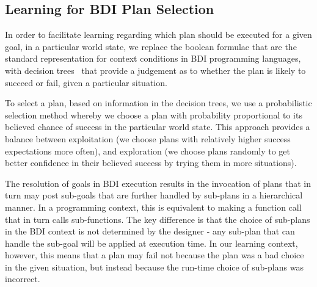 \subsection{Learning for BDI Plan Selection}
In order to facilitate learning regarding which plan should be
executed for a given goal, in a particular world state, we replace the
boolean formulae that are the standard representation for context
conditions in BDI programming languages, with decision
trees~\cite{Mitchell97:ML} that provide a judgement as to whether the
plan is likely to succeed or fail, given a particular situation. 

To select a plan, based on information in the decision trees, we use a
probabilistic selection method whereby we choose a plan with
probability proportional to its believed chance of success in the
particular world state. This approach provides a balance between
exploitation (we choose plans with relatively higher success expectations
more often), and exploration (we choose plans randomly to get better
confidence in their believed success by trying them in more 
situations).

The resolution of goals in BDI execution results in 
the invocation of plans that in turn may post sub-goals that are further
handled by sub-plans in a hierarchical manner. In a programming context,
this is equivalent to making a function call that in turn calls sub-functions.
The key difference is that the choice of sub-plans in the BDI context is
not determined by the designer - any sub-plan that can handle 
the sub-goal will be applied at execution time. In our learning context, however,
this means that a plan may fail not because the plan was a bad choice in the
given situation, but instead because the run-time choice of sub-plans was
incorrect. 


